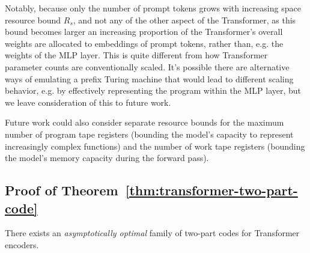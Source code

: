 Notably, because only the number of prompt tokens grows with increasing space resource bound $R_s$, and not any of the other aspect of the Transformer, as this bound becomes larger an increasing proportion of the Transformer's overall weights are allocated to embeddings of prompt tokens, rather than, e.g. the weights of the MLP layer.  This is quite different from how Transformer parameter counts are conventionally scaled. It's possible there are alternative ways of emulating a prefix Turing machine that would lead to different scaling behavior, e.g. by effectively representing the program within the MLP layer, but we leave consideration of this to future work.

Future work could also consider separate resource bounds for the maximum number of program tape registers (bounding the model's capacity to represent increasingly complex functions) and the number of work tape registers (bounding the model's memory capacity during the forward pass).

\subsection{Proof of Theorem~\ref{thm:transformer-two-part-code}}
\label{sec:app-proof-transformer-two-part-code}

\begin{thm*}

There exists an \emph{asymptotically optimal} family of two-part codes for Transformer encoders.
\end{thm*}


